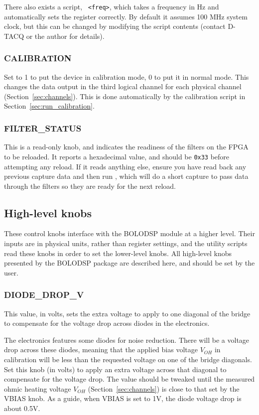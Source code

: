 \documentclass[12pt,a4paper]{article}
\begin{document}
There also exists a script, ~\texttt{<freq>}, which takes a frequency in Hz and automatically sets the register
correctly. By default it assumes 100 MHz system clock, but this can be changed by modifying the script contents (contact D-TACQ or the author for
details).

\subsubsection{CALIBRATION}
Set to 1 to put the device in calibration mode, 0 to put it in normal mode. This changes the data output in the third logical channel for each physical
channel (Section~\ref{sec:channels}). This is done automatically by the calibration script in Section~\ref{sec:run_calibration}.

\subsubsection{FILTER{\_}STATUS}
This is a read-only knob, and indicates the readiness of the filters on the FPGA to be reloaded. It reports a hexadecimal value, and should be
\texttt{0x33} before attempting any reload. If it reads anything else, ensure you have read back any previous capture data and then run
\mbox{}, which will do a short capture to pass data through the filters so they are ready for the next reload.

\subsection{High-level knobs}
\label{sec:knobshl}
These control knobs interface with the BOLODSP module at a higher level. Their inputs are in physical units, rather than register settings, and the
utility scripts read these knobs in order to set the lower-level knobs. All high-level knobs presented by the BOLODSP package are described here, and
should be set by the user.

\subsubsection{DIODE{\_}DROP{\_}V}
This value, in volts, sets the extra voltage to apply to one diagonal of the bridge to compensate for the voltage drop across diodes in the electronics.

The electronics features some diodes for noise reduction. There will be a voltage drop across these diodes, meaning that the applied bias voltage $V_{OH}$
in calibration will be less than the requested voltage on one of the bridge diagonals. Set this knob (in volts) to apply an extra voltage across that
diagonal to compensate for the voltage drop. The value should be tweaked until the measured ohmic heating voltage $V_{OH}$ (Section~\ref{sec:channels}) is
close to that set by the VBIAS knob. As a guide, when VBIAS is set to 1V, the diode voltage drop is about 0.5V.
\end{document}
